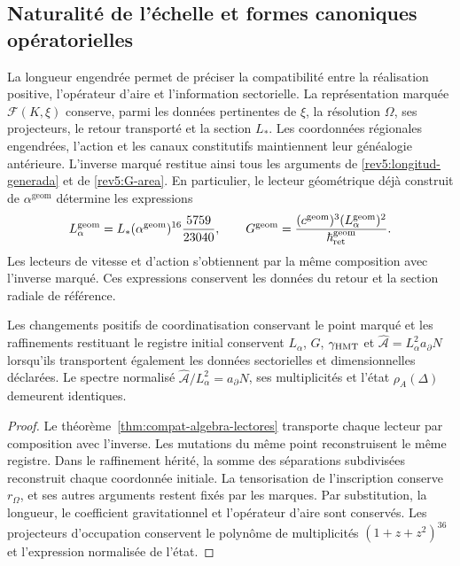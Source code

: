 \subsection{Naturalité de l’échelle et formes canoniques opératorielles}
\label{rev5:naturalidad-areal}

La longueur engendrée permet de préciser la compatibilité entre la
réalisation positive, l’opérateur d’aire et l’information sectorielle.
La représentation marquée \(\mathcal F(K,\xi)\) conserve,
parmi les données pertinentes de \(\xi\), la résolution
\(\Omega\), ses projecteurs, le retour transporté et la section
\(L_*\). Les coordonnées régionales engendrées, l’action et les canaux
constitutifs maintiennent leur généalogie antérieure. L’inverse marqué
restitue ainsi tous les arguments de
\eqref{rev5:longitud-generada} et de \eqref{rev5:G-area}.
En particulier, le lecteur géométrique déjà construit de
\(\alpha^{\mathrm{geom}}\) détermine les expressions
\[
 L_\alpha^{\mathrm{geom}}
 =L_*(\alpha^{\mathrm{geom}})^{16}\frac{5759}{23040},
 \qquad
 G^{\mathrm{geom}}
 =\frac{(c^{\mathrm{geom}})^3
 (L_\alpha^{\mathrm{geom}})^2}{\hbar_{\rm ret}^{\mathrm{geom}}}.
\]
Les lecteurs de vitesse et d’action s’obtiennent par la même
composition avec l’inverse marqué. Ces expressions conservent
les données du retour et la section radiale de référence.

\begin{corollary}
\label{rev5:conservacion}
Les changements positifs de coordinatisation conservant le point marqué et les raffinements restituant le registre initial conservent \(L_\alpha\), \(G\), \(\gamma_{\rm HMT}\) et \(\widehat{\mathcal A}=L_\alpha^2a_\partial N\) lorsqu'ils transportent également les données sectorielles et dimensionnelles déclarées. Le spectre normalisé \(\widehat{\mathcal A}/L_\alpha^2=a_\partial N\), ses multiplicités et l'état \(\rho_A(\Delta)\) demeurent identiques.
\end{corollary}
\begin{proof}
Le théorème~\ref{thm:compat-algebra-lectores} transporte chaque lecteur
par composition avec l’inverse. Les mutations du même point
reconstruisent le même registre. Dans le raffinement hérité, la somme
des séparations subdivisées reconstruit chaque coordonnée initiale.
La tensorisation de l’inscription conserve \(r_\Omega\),
et ses autres arguments restent fixés par les marques. Par
substitution, la longueur, le coefficient gravitationnel et
l’opérateur d’aire sont conservés. Les projecteurs d’occupation conservent le
polynôme de multiplicités \((1+z+z^2)^{36}\) et l’expression
normalisée de l’état.
\end{proof}

